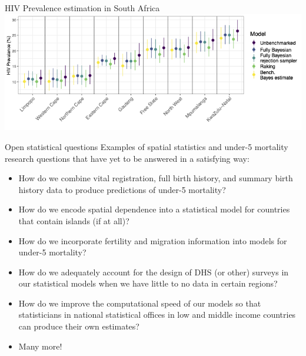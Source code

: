 \documentclass[10pt,t]{beamer}
\begin{document}
\begin{frame}[c]{HIV Prevalence estimation in South Africa}
\centering \includegraphics[scale=0.4]{ranking_plot.png}
\end{frame}

\begin{frame}{Open statistical questions}
Examples of spatial statistics and under-5 mortality research questions that have yet to be answered in a satisfying way:

\vspace{0.3cm}

\begin{itemize}
	\item How do we combine vital registration, full birth history, and summary birth history data to produce predictions of under-5 mortality?
	\item How do we encode spatial dependence into a statistical model for countries that contain islands (if at all)?
	\item How do we incorporate fertility and migration information into models for under-5 mortality?
	\item How do we adequately account for the design of DHS (or other) surveys in our statistical models when we have little to no data in certain regions?
	\item How do we improve the computational speed of our models so that statisticians in national statistical offices in low and middle income countries can produce their own estimates?
	\item Many more!
\end{itemize}

\end{frame}
\end{document}

